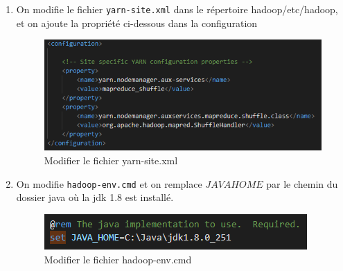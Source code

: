 \begin{enumerate}
\item On modifie le fichier \texttt{yarn-site.xml} dans le répertoire hadoop/etc/hadoop, et on ajoute la propriété ci-dessous dans la configuration
\begin{figure}[h]
	\centering
    \includegraphics[scale=0.6]{img/part3/1.8}
    \caption{Modifier le fichier yarn-site.xml}
\end{figure}

\item On modifie \texttt{hadoop-env.cmd} et on remplace $JAVA HOME$ par le chemin du dossier java où la jdk 1.8 est installé.
\begin{figure}[h]
	\centering
    \includegraphics[scale=0.6]{img/part3/1.9}
    \caption{Modifier le fichier hadoop-env.cmd}
\end{figure}

\end{enumerate}

\newpage
